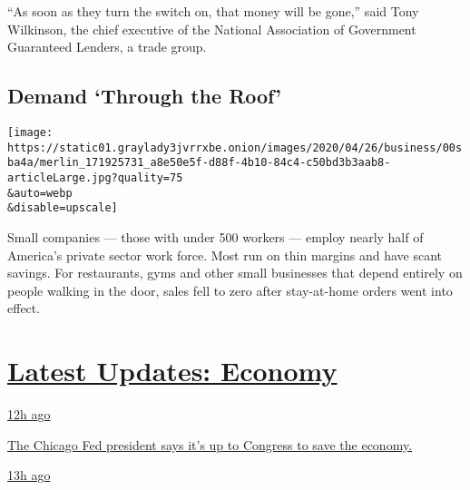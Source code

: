 ``As soon as they turn the switch on, that money will be gone,'' said
Tony Wilkinson, the chief executive of the National Association of
Government Guaranteed Lenders, a trade group.

\hypertarget{demand-through-the-roof}{%
\subsection{Demand `Through the Roof'}\label{demand-through-the-roof}}

\texttt{[image: https://static01.graylady3jvrrxbe.onion/images/2020/04/26/business/00sba4a/merlin\_171925731\_a8e50e5f-d88f-4b10-84c4-c50bd3b3aab8-articleLarge.jpg?quality=75\\\&auto=webp\\\&disable=upscale]}

Small companies --- those with under 500 workers --- employ nearly half
of America's private sector work force. Most run on thin margins and
have scant savings. For restaurants, gyms and other small businesses
that depend entirely on people walking in the door, sales fell to zero
after stay-at-home orders went into effect.

\hypertarget{latest-updates-economy}{%
\section{\texorpdfstring{\href{https://www.nytimes3xbfgragh.onion/live/2020/08/03/business/stock-market-today-coronavirus?action=click\&pgtype=Article\&state=default\&region=MAIN_CONTENT_1\&context=storylines_live_updates}{Latest
Updates:
Economy}}{Latest Updates: Economy}}\label{latest-updates-economy}}

\href{https://www.nytimes3xbfgragh.onion/live/2020/08/03/business/stock-market-today-coronavirus?action=click\&pgtype=Article\&state=default\&region=MAIN_CONTENT_1\&context=storylines_live_updates\#the-chicago-fed-president-says-its-up-to-congress-to-save-the-economy}{12h
ago}

\href{https://www.nytimes3xbfgragh.onion/live/2020/08/03/business/stock-market-today-coronavirus?action=click\&pgtype=Article\&state=default\&region=MAIN_CONTENT_1\&context=storylines_live_updates\#the-chicago-fed-president-says-its-up-to-congress-to-save-the-economy}{The
Chicago Fed president says it's up to Congress to save the economy.}

\href{https://www.nytimes3xbfgragh.onion/live/2020/08/03/business/stock-market-today-coronavirus?action=click\&pgtype=Article\&state=default\&region=MAIN_CONTENT_1\&context=storylines_live_updates\#faa-says-boeing-has-effectively-mitigated-defects-in-the-737-max}{13h
ago}

